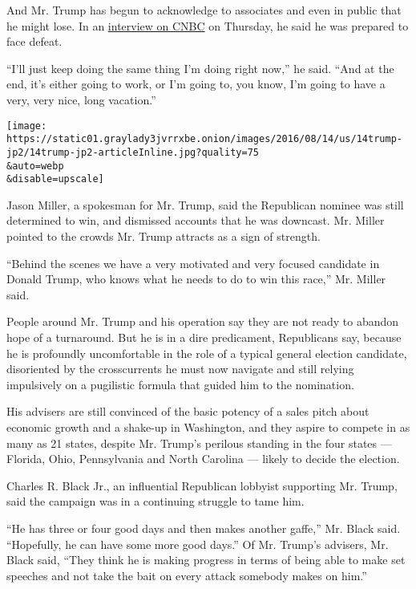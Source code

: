 And Mr. Trump has begun to acknowledge to associates and even in public
that he might lose. In an
\href{http://video.cnbc.com/gallery/?video=3000542306}{interview on
CNBC} on Thursday, he said he was prepared to face defeat.

``I'll just keep doing the same thing I'm doing right now,'' he said.
``And at the end, it's either going to work, or I'm going to, you know,
I'm going to have a very, very nice, long vacation.''

\texttt{[image: https://static01.graylady3jvrrxbe.onion/images/2016/08/14/us/14trump-jp2/14trump-jp2-articleInline.jpg?quality=75\\\&auto=webp\\\&disable=upscale]}

Jason Miller, a spokesman for Mr. Trump, said the Republican nominee was
still determined to win, and dismissed accounts that he was downcast.
Mr. Miller pointed to the crowds Mr. Trump attracts as a sign of
strength.

``Behind the scenes we have a very motivated and very focused candidate
in Donald Trump, who knows what he needs to do to win this race,'' Mr.
Miller said.

People around Mr. Trump and his operation say they are not ready to
abandon hope of a turnaround. But he is in a dire predicament,
Republicans say, because he is profoundly uncomfortable in the role of a
typical general election candidate, disoriented by the crosscurrents he
must now navigate and still relying impulsively on a pugilistic formula
that guided him to the nomination.

His advisers are still convinced of the basic potency of a sales pitch
about economic growth and a shake-up in Washington, and they aspire to
compete in as many as 21 states, despite Mr. Trump's perilous standing
in the four states --- Florida, Ohio, Pennsylvania and North Carolina
--- likely to decide the election.

Charles R. Black Jr., an influential Republican lobbyist supporting Mr.
Trump, said the campaign was in a continuing struggle to tame him.

``He has three or four good days and then makes another gaffe,'' Mr.
Black said. ``Hopefully, he can have some more good days.'' Of Mr.
Trump's advisers, Mr. Black said, ``They think he is making progress in
terms of being able to make set speeches and not take the bait on every
attack somebody makes on him.''

\href{https://www.nytimes3xbfgragh.onion/interactive/2016/08/09/us/elections/Bush-Rubio-and-Kasich-Donors-give-to-Clinton.html}{}

